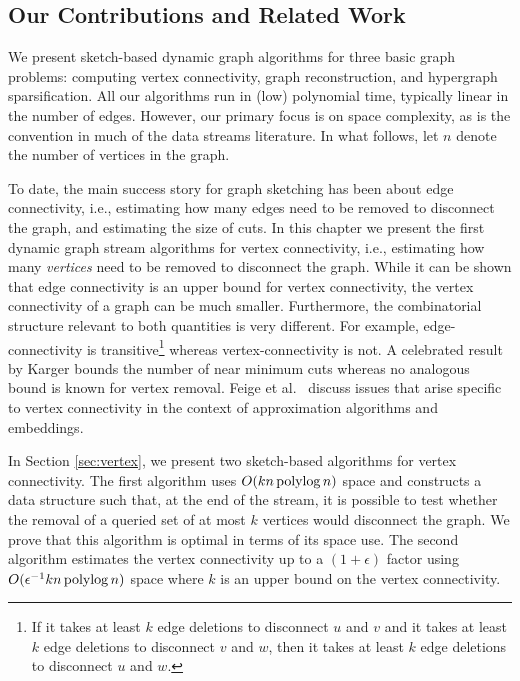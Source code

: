 \subsection{Our Contributions and Related Work}
We present sketch-based dynamic graph algorithms for three basic graph problems: computing vertex connectivity, graph reconstruction, and hypergraph sparsification. All our algorithms run in (low) polynomial time, typically linear in the number of edges. However, our primary focus is on space complexity, as is the convention in much of the data streams literature. In what follows, let $n$ denote the number of vertices in the graph.

 To date, the main success story for graph sketching has been  about edge connectivity, i.e., estimating how many edges need to be removed to disconnect the graph, and estimating the size of cuts. In this chapter we present the first dynamic graph stream algorithms for vertex connectivity, i.e., estimating how many \emph{vertices} need to be removed to disconnect the graph. While it can be shown that edge connectivity is an upper bound for vertex connectivity, the vertex connectivity of a graph can be much smaller. Furthermore, the combinatorial structure relevant to both quantities is very different. For example, edge-connectivity is transitive\footnote{If it takes at least $ k$ edge deletions to disconnect $u$ and $v$ and it takes at least $ k$ edge deletions to disconnect $v$ and $w$, then it takes at least $ k$ edge deletions to disconnect $u$ and $w$.} whereas vertex-connectivity is not. A celebrated result by Karger \cite{karger1994} bounds the number of near minimum cuts whereas no analogous bound is known for vertex removal.  Feige et al.~\cite{FeigeHL05} discuss issues that arise specific to vertex connectivity in the context of approximation algorithms and embeddings.


In Section \ref{sec:vertex}, we present two sketch-based algorithms for vertex connectivity. The first algorithm uses $O(kn\operatorname{polylog} n)$ space and constructs a data structure such that, at the end of the stream, it is possible to test whether the removal of a queried set of at most $k$ vertices would disconnect the graph. We  prove that this algorithm is optimal in terms of its space use. The second algorithm estimates the vertex connectivity up to a  $(1+\epsilon)$ factor using $O(\epsilon^{-1} kn\operatorname{polylog} n)$ space where $k$ is an upper bound on the vertex connectivity. 

